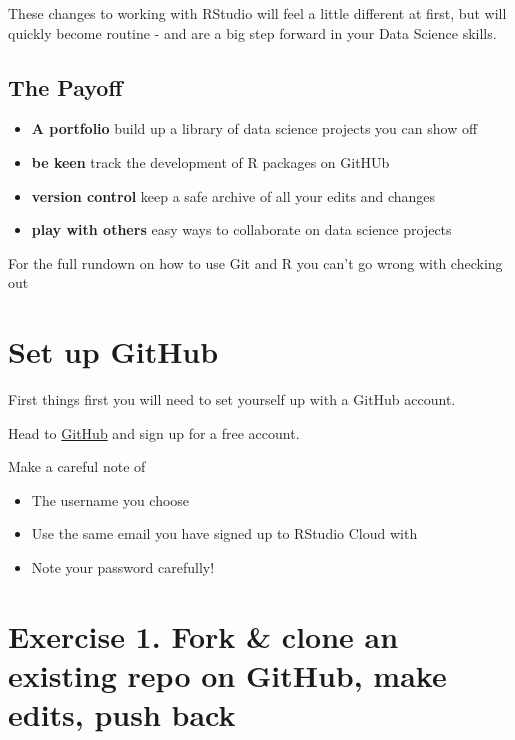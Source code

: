 \documentclass[
]{book}
\makeatletter
\newenvironment{kframe}{%
\medskip{}
\setlength{\fboxsep}{.8em}
 \def\at@end@of@kframe{}%
 \ifinner\ifhmode%
  \def\at@end@of@kframe{\end{minipage}}%
  \begin{minipage}{\columnwidth}%
 \fi\fi%
 \def\FrameCommand##1{\hskip\@totalleftmargin \hskip-\fboxsep
 \colorbox{shadecolor}{##1}\hskip-\fboxsep
     \hskip-\linewidth \hskip-\@totalleftmargin \hskip\columnwidth}%
 \MakeFramed {\advance\hsize-\width
   \@totalleftmargin\z@ \linewidth\hsize
   \@setminipage}}%
 {\par\unskip\endMakeFramed%
 \at@end@of@kframe}
\newenvironment{block}[1]
  {
  \begin{itemize}
  \renewcommand{\labelitemi}{
    \raisebox{-.7\height}[0pt][0pt]{
      {\setkeys{Gin}{width=3em,keepaspectratio}\texttt{[image: images/\#1]}}
    }
  }
  \setlength{\fboxsep}{1em}
  \begin{kframe}
  \item
  }
  {
  \end{kframe}
  \end{itemize}
  }
\newenvironment{rmdwarning}
  {\begin{block}{warning}}
  {\end{block}}
\makeatother
\begin{document}
These changes to working with RStudio will feel a little different at first, but will quickly become routine - and are a big step forward in your Data Science skills.

\hypertarget{the-payoff}{%
\subsection{The Payoff}\label{the-payoff}}

\begin{itemize}
\item
  \textbf{A portfolio} build up a library of data science projects you can show off
\item
  \textbf{be keen} track the development of R packages on GitHUb
\item
  \textbf{version control} keep a safe archive of all your edits and changes
\item
  \textbf{play with others} easy ways to collaborate on data science projects
\end{itemize}

For the full rundown on how to use Git and R you can't go wrong with checking out \citet{happygit}

\hypertarget{set-up-github}{%
\section{Set up GitHub}\label{set-up-github}}

First things first you will need to set yourself up with a GitHub account.

Head to \href{https://github.com/}{GitHub} and sign up for a free account.

\begin{rmdwarning}
Make a careful note of

\begin{itemize}
\item
  The username you choose
\item
  Use the same email you have signed up to RStudio Cloud with
\item
  Note your password carefully!
\end{itemize}
\end{rmdwarning}

\hypertarget{exercise-1.-fork-clone-an-existing-repo-on-github-make-edits-push-back}{%
\section{\texorpdfstring{\textbf{Exercise 1.} Fork \& clone an existing repo on GitHub, make edits, push back}{Exercise 1. Fork \& clone an existing repo on GitHub, make edits, push back}}\label{exercise-1.-fork-clone-an-existing-repo-on-github-make-edits-push-back}}
\end{document}
